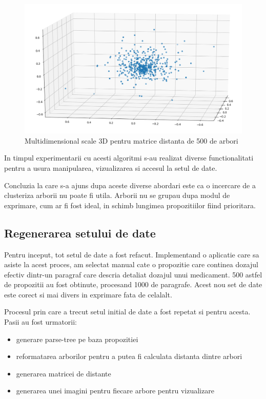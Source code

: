 \documentclass[a4paper,12pt]{article}
\begin{document}
\clearpage
\begin{figure}[h]
\centering
 \includegraphics[width=16cm]{mds.png}
 \caption{Multidimensional scale 3D pentru matrice distanta de 500 de arbori}
 \end{figure}
 
 In timpul experimentarii cu acesti algoritmi s-au realizat diverse functionalitati pentru a usura manipularea, vizualizarea si accesul la setul de date.
 
 Concluzia la care s-a ajuns dupa aceste diverse abordari este ca o incercare de a clusteriza arborii nu poate fi utila. Arborii nu se grupau dupa modul de exprimare, cum ar fi fost ideal, in schimb lungimea propozitiilor fiind prioritara.
 \clearpage
 
 \subsection{Regenerarea setului de date}
 Pentru inceput, tot setul de date a fost refacut. Implementand o aplicatie care sa asiste la acest proces, am selectat manual cate o propozitie care continea dozajul efectiv dintr-un paragraf care descria detaliat dozajul unui medicament. 500 astfel de propozitii au fost obtinute, procesand 1000 de paragrafe. Acest nou set de date este corect si mai divers in exprimare fata de celalalt.
 
 Procesul prin care a trecut setul initial de date a fost repetat si pentru acesta. Pasii au fost urmatorii:
 \begin{itemize}
 \item generare parse-tree pe baza propozitiei
 \item reformatarea arborilor pentru a putea fi calculata distanta dintre arbori
 \item generarea matricei de distante
 \item generarea unei imagini pentru fiecare arbore pentru vizualizare
 \end{itemize}
 
\end{document}
